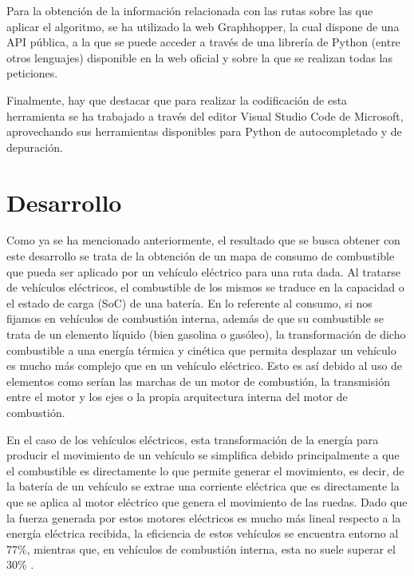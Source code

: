 \documentclass[11pt,spanish,listoffigures,listoftables]{tfgetsinf}
\begin{document}
Para la obtención de la información relacionada con las rutas sobre las que aplicar el algoritmo, se ha utilizado la web Graphhopper, la cual dispone de una API pública, a la que se puede acceder a través de una librería de Python (entre otros lenguajes) disponible en la web oficial y sobre la que se realizan todas las peticiones. 

Finalmente, hay que destacar que para realizar la codificación de esta herramienta se ha trabajado a través del editor Visual Studio Code de Microsoft, aprovechando sus herramientas disponibles para Python de autocompletado y de depuración.


\chapter{Desarrollo}
Como ya se ha mencionado anteriormente, el resultado que se busca obtener con este desarrollo se trata de la obtención de un mapa de consumo de combustible que pueda ser aplicado por un vehículo eléctrico para una ruta dada. Al tratarse de vehículos eléctricos, el combustible de los mismos se traduce en la capacidad o el estado de carga (SoC) de una batería. En lo referente al consumo, si nos fijamos en vehículos de combustión interna, además de que su combustible se trata de un elemento líquido (bien gasolina o gasóleo), la transformación de dicho combustible a una energía térmica y cinética que permita desplazar un vehículo es mucho más complejo que en un vehículo eléctrico. Esto es así debido al uso de elementos como serían las marchas de un motor de combustión, la transmisión entre el motor y los ejes o la propia arquitectura interna del motor de combustión.

En el caso de los vehículos eléctricos, esta transformación de la energía para producir el movimiento de un vehículo se simplifica debido principalmente a que el combustible es directamente lo que permite generar el movimiento, es decir, de la batería de un vehículo se extrae una corriente eléctrica que es directamente la que se aplica al motor eléctrico que genera el movimiento de las ruedas. Dado que la fuerza generada por estos motores eléctricos es mucho más lineal respecto a la energía eléctrica recibida, la eficiencia de estos vehículos se encuentra entorno al 77\%, mientras que, en vehículos de combustión interna, esta no suele superar el 30\% \cite{MILLER2011}.
\end{document}
